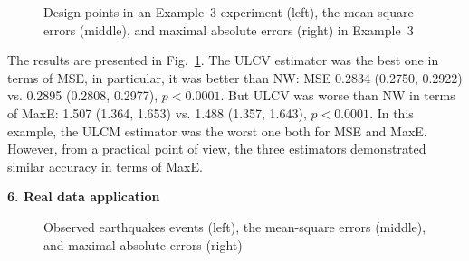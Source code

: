 \documentclass[12pt]{article}
\theoremstyle{remark}
\begin{document}
%
%
%
\begin{figure}[!h]
    \centering
    \vspace{-12pt}
    \caption{Design points in an Example~3 experiment (left), the mean-square errors (middle), and maximal absolute errors (right) in Example~3}\label{ex3mse}
\end{figure}


The results are presented in Fig.~\ref{ex3mse}.
The ULCV estimator was the best one in terms of MSE, in particular, it was better than NW: MSE
0.2834  (0.2750, 0.2922) vs.
0.2895  (0.2808,  0.2977), $p<0.0001$.
But ULCV was worse than NW in terms of MaxE:
1.507  (1.364,   1.653) vs.
1.488 (1.357,   1.643), $p<0.0001$.
In this example, the ULCM estimator was the worst one both for MSE and MaxE.
However, from a practical point of view, the three estimators demonstrated similar accuracy in terms of MaxE.

\bigskip
\begin{center}
{\bf 6. Real data application}
\end{center}

\begin{figure}[!h]
    \centering
    \vspace{-12pt}
    \caption{Observed earthquakes events (left), the mean-square errors (middle), and maximal absolute errors (right)}\label{eqmse}
\end{figure}
\end{document}
